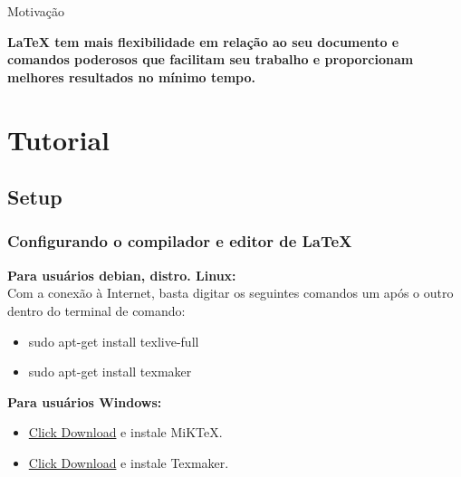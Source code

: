\documentclass[10pt]{beamer}
\begin{document}
\begin{frame}{Motivação}


\begin{center}

\bfseries \Large \LaTeX\hspace{0.01cm}  tem mais flexibilidade em relação ao seu documento e comandos poderosos que facilitam seu trabalho e proporcionam melhores resultados no mínimo tempo.

\end{center}

\end{frame}




\section{Tutorial}

\subsection{Setup}

\begin{frame}[fragile]
\frametitle{Configurando o compilador e editor de \LaTeX\vspace{0.2cm}}


\textbf{Para usuários debian, distro. Linux:}\\
Com a conexão à Internet, basta digitar os seguintes comandos um após o outro dentro do terminal de comando:
\begin{itemize}

\item \textsf{sudo apt-get install texlive-full}
\item \textsf{sudo apt-get install texmaker}
\end{itemize}



\textbf{Para usuários Windows:}
\begin{itemize}
\item \href{https://miktex.org/download}{Click Download} e instale MiKTeX.
\item \href{http://www.xm1math.net/texmaker/}{Click Download} e instale Texmaker.
\end{itemize}


\end{frame}
\end{document}
